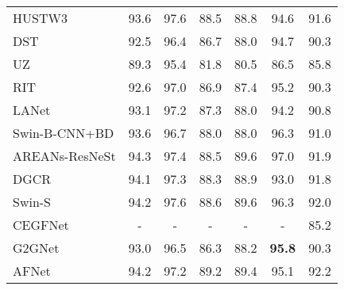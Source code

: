 \documentclass[journal]{IEEEtran}
\begin{document}
\begin{table*}[h!]
\begin{tabular}{lcccccc}
HUSTW3 \cite{SUN2019297}  
& 93.6                   &97.6        & 88.5                   & 88.8             & 94.6         & 91.6                                             \\
DST \cite{7301381}                          & 92.5                     & 96.4                 & 86.7                   & 88.0            & 94.7            & 90.3  \\        
UZ \cite{rs9050446}                            & 89.3                     & 95.4          & 81.8            & 80.5     & 86.5      & 85.8 \\                        
RIT \cite{8727958}                  & 92.6             & 97.0        & 86.9           & 87.4       & 95.2      & 90.3 \\                                     
LANet \cite{9102424}                         & 93.1            & 97.2            & 87.3         & 88.0        & 94.2       & 90.8   \\
Swin-B-CNN+BD \cite{9686732}      & 93.6       & 96.7          & 88.0          & 88.0      & 96.3        & 91.0 \\                                                  
AREANs-ResNeSt \cite{doi:10.1080/2150704X.2021.1910362}                
                 & 94.3    & 97.4  & 88.5       & 89.6   & 97.0           & 91.9                 \\               
DGCR \cite{9690154}             & 94.1                   &97.3                 & 88.3         & 88.9   & 93.0           & 91.8                                             \\                        
Swin-S \cite{9681903}             & 94.2        & 97.6         & 88.6             & 89.6         & 96.3       & 92.0                                          \\    
CEGFNet \cite{9538389}                       & {-}                        & {-}                    & {-}                      & {-}                & {-}               & 85.2  \\                                       
G2GNet \cite{9519842}                       & 93.0                   & 96.5              & 86.3                 & 88.2             & \textbf{95.8}   & 90.3                                             \\
AFNet \cite{9258402}                         &94.2                  & 97.2                & 89.2                   & 89.4           & 95.1            & 92.2                                           \\

\end{tabular}
\end{table*}
\end{document}
